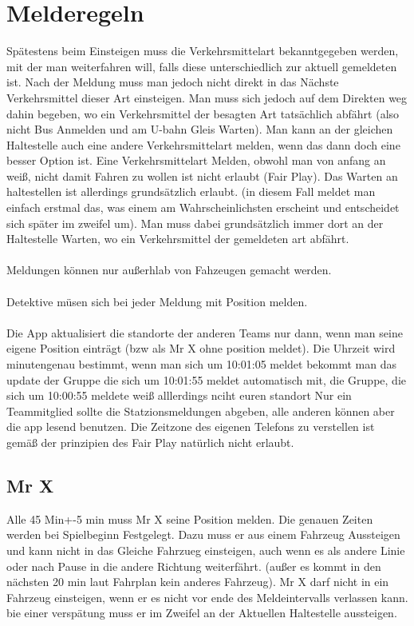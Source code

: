 \documentclass[12pt,a4paper]{article}
\begin{document}
\section{Melderegeln}
Spätestens beim Einsteigen muss die Verkehrsmittelart bekanntgegeben werden, mit der man weiterfahren will, falls diese unterschiedlich zur aktuell gemeldeten ist.
Nach der Meldung muss man jedoch nicht direkt in das Nächste Verkehrsmittel dieser Art einsteigen.
Man muss sich jedoch auf dem Direkten weg dahin begeben, wo ein Verkehrsmittel der besagten Art tatsächlich abfährt
(also nicht Bus Anmelden und am U-bahn Gleis Warten).
Man kann an der gleichen Haltestelle auch eine andere Verkehrsmittelart melden, wenn das dann doch eine besser Option ist.
Eine Verkehrsmittelart Melden, obwohl man von anfang an weiß, nicht damit Fahren zu wollen ist nicht erlaubt (Fair Play).
Das Warten an haltestellen ist allerdings grundsätzlich erlaubt. (in diesem Fall meldet man einfach erstmal das, was einem am Wahrscheinlichsten erscheint und entscheidet sich später im zweifel um).
Man muss dabei grundsätzlich immer dort an der Haltestelle Warten, wo ein Verkehrsmittel der gemeldeten art abfährt.
\\
\\
Meldungen können nur außerhlab von Fahzeugen gemacht werden.\\
\\
Detektive müsen sich bei jeder Meldung mit Position melden.\\
\\
Die App aktualisiert die standorte der anderen Teams nur dann, wenn man seine eigene Position einträgt (bzw als Mr X ohne position meldet).
Die Uhrzeit wird minutengenau bestimmt, wenn man sich um 10:01:05 meldet bekommt man das update der Gruppe die sich um 10:01:55 meldet automatisch mit, die Gruppe, die sich um 10:00:55 meldete weiß alllerdings nciht euren standort
Nur ein Teammitglied sollte die Statzionsmeldungen abgeben, alle anderen können aber die app lesend benutzen.
Die Zeitzone des eigenen Telefons zu verstellen ist gemäß der prinzipien des Fair Play natürlich nicht erlaubt.

\subsection{Mr X}
Alle 45 Min+-5 min muss Mr X seine Position melden.
Die genauen Zeiten werden bei Spielbeginn Festgelegt.
Dazu muss er aus einem Fahrzeug Aussteigen und kann nicht in das Gleiche Fahrzueg einsteigen, auch wenn es als andere Linie oder nach Pause in die andere Richtung weiterfährt. (außer es kommt in den nächsten 20 min laut Fahrplan kein anderes Fahrzeug).
Mr X darf nicht in ein Fahrzeug einsteigen, wenn er es nicht vor ende des Meldeintervalls verlassen kann.
bie einer verspätung muss er im Zweifel an der Aktuellen Haltestelle aussteigen.
\end{document}
